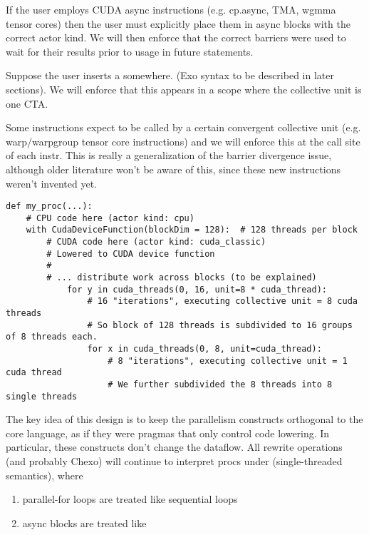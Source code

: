 \filbreak
{} If the user employs CUDA async instructions (e.g. cp.async, TMA, wgmma tensor cores) then the user must explicitly place them in async blocks with the correct actor kind.
We will then enforce that the correct barriers were used to wait for their results prior to usage in future statements.

\filbreak
{} Suppose the user inserts a  somewhere.
(Exo syntax to be described in later sections).
We will enforce that this appears in a scope where the collective unit is one CTA.

\filbreak
{} Some instructions expect to be called by a certain convergent collective unit (e.g. warp/warpgroup tensor core instructions) and we will enforce this at the call site of each instr.
This is really a generalization of the barrier divergence issue, although older literature won't be aware of this, since these new instructions weren't invented yet.

\filbreak
{}
{\color{lightttColor}
\begin{verbatim}
def my_proc(...):
    # CPU code here (actor kind: cpu)
    with CudaDeviceFunction(blockDim = 128):  # 128 threads per block
        # CUDA code here (actor kind: cuda_classic)
        # Lowered to CUDA device function
        #
        # ... distribute work across blocks (to be explained)
            for y in cuda_threads(0, 16, unit=8 * cuda_thread):
                # 16 "iterations", executing collective unit = 8 cuda threads
                # So block of 128 threads is subdivided to 16 groups of 8 threads each.
                for x in cuda_threads(0, 8, unit=cuda_thread):
                    # 8 "iterations", executing collective unit = 1 cuda thread
                    # We further subdivided the 8 threads into 8 single threads
\end{verbatim}
}

\filbreak
{}

The key idea of this design is to keep the parallelism constructs orthogonal to the core language, as if they were pragmas that only control code lowering.
In particular, these constructs don't change the dataflow.
All rewrite operations (and probably Chexo) will continue to interpret procs under  (single-threaded semantics), where
\begin{enumerate}
  \item parallel-for loops are treated like sequential loops
  \item async blocks are treated like 
\end{enumerate}

